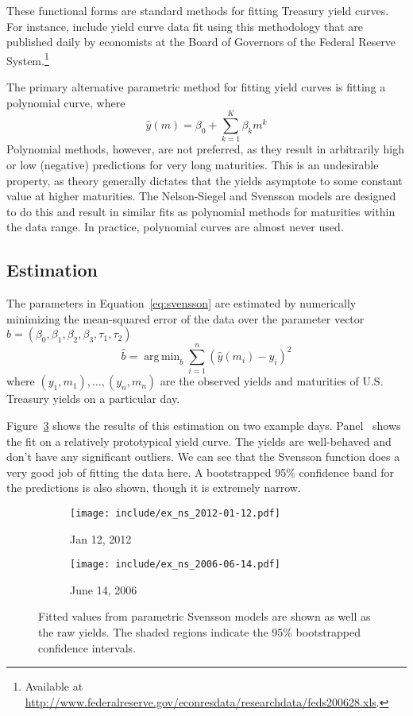 \documentclass[12pt]{article}
\DeclareMathOperator*{\argmin}{arg\,min}
\begin{document}
These functional forms are standard methods for fitting Treasury yield curves. For instance, \citet{gsw06} include yield curve data fit using this methodology that are published daily by economists at the Board of Governors of the Federal Reserve System.\footnote{Available at \url{http://www.federalreserve.gov/econresdata/researchdata/feds200628.xls}.}

The primary alternative parametric method for fitting yield curves is fitting a polynomial curve, where
\begin{equation*}
\hat{y}(m) = \beta_0 + \sum_{k=1}^K \beta_k m^k
\end{equation*}
Polynomial methods, however, are not preferred, as they result in arbitrarily high or low (negative) predictions for very long maturities. This is an undesirable property, as theory generally dictates that the yields asymptote to some constant value at higher maturities. The Nelson-Siegel and Svensson models are designed to do this and result in similar fits as polynomial methods for maturities within the data range. In practice, polynomial curves are almost never used.


\subsection{Estimation}

The parameters in Equation~\ref{eq:svensson} are estimated by numerically minimizing the mean-squared error of the data over the parameter vector $b = (\beta_0, \beta_1, \beta_2, \beta_3, \tau_1, \tau_2)$
\begin{equation*}
\hat{b} = \argmin_{b} \sum_{i=1}^n \left( \hat{y}(m_i) - y_i \right)^2
\end{equation*}
where $(y_1, m_1), \dots, (y_n, m_n)$ are the observed yields and maturities of U.S. Treasury yields on a particular day.

Figure~\ref{fig:ex_ns} shows the results of this estimation on two example days. Panel~ shows the fit on a relatively prototypical yield curve. The yields are well-behaved and don't have any significant outliers. We can see that the Svensson function does a very good job of fitting the data here. A bootstrapped 95\% confidence band for the predictions is also shown, though it is extremely narrow.

\begin{figure}[htb] \centering
    \begin{subfigure}[t]{.49\linewidth}
        \texttt{[image: include/ex\_ns\_2012-01-12.pdf]}
        \caption{Jan 12, 2012} \label{fig:ex_ns_1-12-2012}
    \end{subfigure}
    \begin{subfigure}[t]{.49\linewidth}
        \texttt{[image: include/ex\_ns\_2006-06-14.pdf]}
        \caption{June 14, 2006} \label{fig:ex_ns_6-14-2006}
    \end{subfigure}
    \caption{Fitted values from parametric Svensson models are shown as well as the raw yields. The shaded regions indicate the 95\% bootstrapped confidence intervals.}
    \label{fig:ex_ns}
\end{figure}
\end{document}
